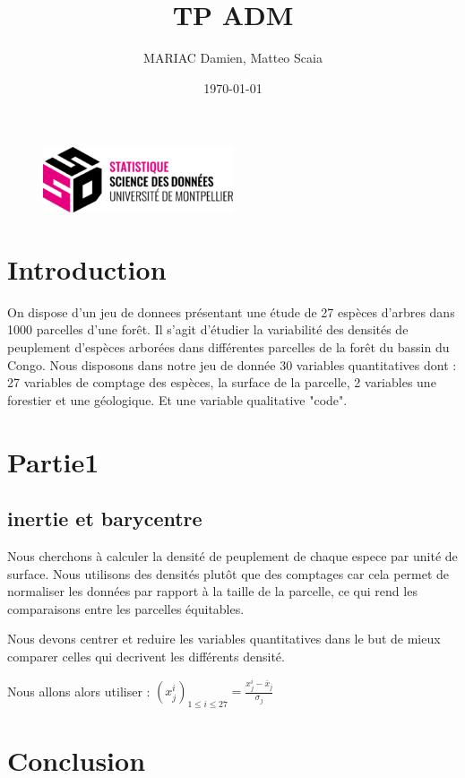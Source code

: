 \documentclass{article}
\title{TP ADM}
\author{MARIAC Damien, Matteo Scaia}
\date{\today}
\begin{document}
\maketitle

\begin{figure}[h] 
    \centering
    \includegraphics[width=0.5\textwidth]{ssd_logo.png} 
\end{figure}

\tableofcontents

\section{Introduction}
On dispose d’un jeu de donnees présentant une étude de 27 espèces d'arbres dans 1000 parcelles d'une forêt.
Il s'agit d'étudier la variabilité des densités de peuplement d'espèces arborées dans différentes parcelles de la forêt du bassin du Congo.
Nous disposons dans notre jeu de donnée 30 variables quantitatives dont : 27 variables de comptage des espèces, la surface de la parcelle, 2 variables une forestier et une géologique.
Et une variable qualitative "code".

\section{Partie1}
\subsection{inertie et barycentre}

Nous cherchons à calculer la densité de peuplement de chaque espece par unité de surface.
Nous utilisons des densités plutôt que des comptages car cela permet de normaliser les données par rapport à la taille de la parcelle,
ce qui rend les comparaisons entre les parcelles équitables.

Nous devons centrer et reduire les variables quantitatives dans le but de mieux comparer celles qui decrivent les différents densité.

Nous allons alors utiliser : $(x_j^i)_{1 \leq i \leq 27} = \frac{x_j^i - \bar{x}_j}{\sigma_j}$




\section{Conclusion}
\end{document}
